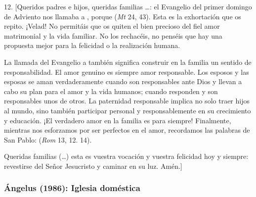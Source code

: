 \begin{body}
					12. {[}Queridos padres e hijos, queridas familias \ldots{}: el Evangelio del primer domingo de Adviento nos llamaba a , porque  (\emph{Mt} 24, 43). Esta es la exhortación que os repito. ¡Velad! No permitáis que os quiten el bien precioso del fiel amor matrimonial y la vida familiar. No los rechacéis, no penséis que hay una propuesta mejor para la felicidad o la realización humana.
					
					La llamada del Evangelio a  también significa construir en la familia un sentido de responsabilidad. El amor genuino es siempre amor responsable. Los esposos y las esposas se aman verdaderamente cuando son responsables ante Dios y llevan a cabo su plan para el amor y la vida humanos; cuando responden y son responsables unos de otros. La paternidad responsable implica no solo traer hijos al mundo, sino también participar personal y responsablemente en su crecimiento y educación. ¡El verdadero amor en la familia es para siempre! Finalmente, mientras nos esforzamos por ser perfectos en el amor, recordamos las palabras de San Pablo:  (\emph{Rom} 13, 12. 14).
					
					Queridas familias (\ldots{}) esta es vuestra vocación y vuestra felicidad hoy y siempre: revestirse del Señor Jesucristo y caminar en su luz. Amén.{]}
				\end{body}
			
			\subsubsection{Ángelus (1986): Iglesia doméstica}
			
				
